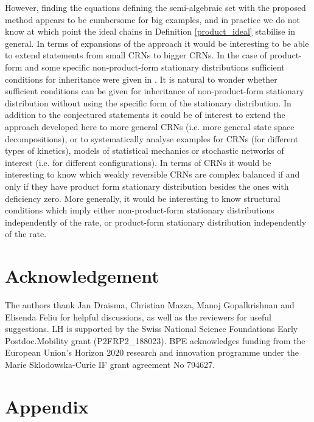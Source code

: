 \documentclass{amsart}
\theoremstyle{definition}
\theoremstyle{remark}
\theoremstyle{Conjecture/open problem}
\theoremstyle{assumption}
\theoremstyle{conjecture}
\numberwithin{equation}{section}
\begin{document}
However, finding the equations defining the semi-algebraic set with the proposed method appears to be cumbersome for big examples, and in practice we do not know at which point the ideal chains in Definition \ref{product_ideal} stabilise in general. In terms of expansions of the approach it would be interesting to be able to extend statements from small CRNs to bigger CRNs. In the case of product-form and some specific non-product-form stationary distributions sufficient conditions for inheritance were given in \cite{hoesslyuni}. It is natural to wonder whether sufficient conditions can be given for inheritance of non-product-form stationary distribution without using the specific form of the stationary distribution. In addition to the conjectured statements it could be of interest to extend the approach developed here to more general CRNs (i.e. more general state space decompositions), or to systematically analyse examples for CRNs (for different types of kinetics), models of statistical mechanics or stochastic networks of interest (i.e. for different configurations). In terms of CRNs it would be interesting to know which weakly reversible CRNs are complex balanced if and only if they have product form stationary distribution besides the ones with deficiency zero. More generally, it would be interesting to know structural conditions which imply either non-product-form stationary distributions independently of the rate, or product-form stationary distribution independently of the rate.


\section*{Acknowledgement}
The authors thank Jan Draisma, Christian Mazza, Manoj Gopalkrishnan and Elisenda Feliu for helpful discussions, as well as the reviewers for useful suggestions. LH is supported by the Swiss National Science Foundations Early Postdoc.Mobility grant (P2FRP2\_188023). BPE acknowledges funding from the European Union's Horizon 2020 research and innovation programme under the Marie Sklodowska-Curie IF grant agreement No 794627.

\section{Appendix}\label{app}
\end{document}
